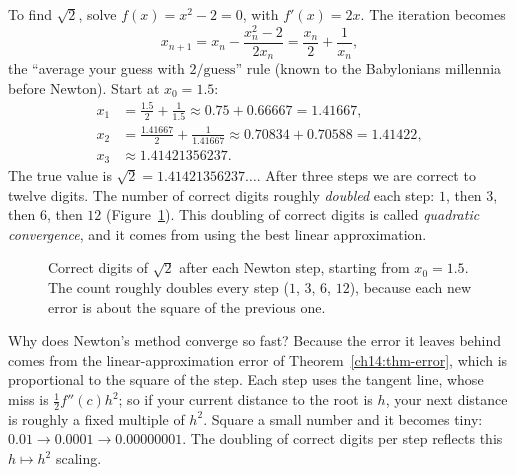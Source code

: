 \begin{example}
\label{ch14:ex-newton-sqrt2}
To find $\sqrt 2$, solve $f(x)=x^2-2=0$, with $f'(x)=2x$. The iteration becomes
\[
x_{n+1} = x_n - \frac{x_n^2 - 2}{2x_n} = \frac{x_n}{2} + \frac{1}{x_n},
\]
the ``average your guess with $2/\text{guess}$'' rule (known to the
Babylonians millennia before Newton). Start at $x_0 = 1.5$:
\[
\begin{aligned}
x_1 &= \tfrac{1.5}{2} + \tfrac{1}{1.5} \approx 0.75 + 0.66667 = 1.41667,\\
x_2 &= \tfrac{1.41667}{2} + \tfrac{1}{1.41667} \approx 0.70834 + 0.70588 = 1.41422,\\
x_3 &\approx 1.41421356237.
\end{aligned}
\]
The true value is $\sqrt 2 = 1.41421356237\ldots$. After three steps we are
correct to twelve digits. The number of correct digits roughly
\emph{doubled} each step: $1$, then $3$, then $6$, then $12$
(Figure~\ref{ch14:fig-newton-digits}). This doubling of correct digits is called
\emph{quadratic convergence}, and it comes from using the best linear
approximation.
\end{example}

\begin{figure}[htbp]
\centering
{}
\caption{Correct digits of $\sqrt 2$ after each Newton step, starting from
$x_0=1.5$. The count roughly doubles every step ($1$, $3$, $6$, $12$), because each
new error is about the square of the previous one.}
\label{ch14:fig-newton-digits}
\end{figure}

\begin{whybox}
Why does Newton's method converge so fast? Because the error it leaves
behind comes from the linear-approximation error of Theorem~\ref{ch14:thm-error},
which is proportional to the square of the step. Each step uses the tangent line, whose miss
is $\tfrac12 f''(c) h^2$; so if your current distance to the root is $h$,
your next distance is roughly a fixed multiple of $h^2$. Square a small number and it becomes tiny:
$0.01 \to 0.0001 \to 0.00000001$. The doubling of correct digits per step reflects this
$h \mapsto h^2$ scaling.
\end{whybox}

